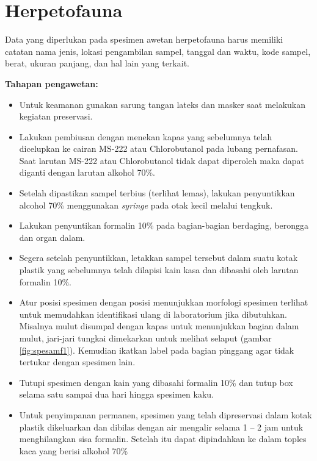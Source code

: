 \documentclass[
  oneside]{book}
\providecommand{\tightlist}{%
  \setlength{\itemsep}{0pt}\setlength{\parskip}{0pt}}
\begin{document}
\hypertarget{herpetofauna-1}{%
\section*{Herpetofauna}\label{herpetofauna-1}}

Data yang diperlukan pada spesimen awetan herpetofauna harus memiliki catatan nama jenis, lokasi pengambilan sampel, tanggal dan waktu, kode sampel, berat, ukuran panjang, dan hal lain yang terkait.

\textbf{Tahapan pengawetan:}

\begin{itemize}
\tightlist
\item
  Untuk keamanan gunakan sarung tangan lateks dan masker saat melakukan kegiatan preservasi.
\item
  Lakukan pembiusan dengan menekan kapas yang sebelumnya telah dicelupkan ke cairan MS-222 atau Chlorobutanol pada lubang pernafasan. Saat larutan MS-222 atau Chlorobutanol tidak dapat diperoleh maka dapat diganti dengan larutan alkohol 70\%.
\item
  Setelah dipastikan sampel terbius (terlihat lemas), lakukan penyuntikkan alcohol 70\% menggunakan \emph{syringe} pada otak kecil melalui tengkuk.
\item
  Lakukan penyuntikan formalin 10\% pada bagian-bagian berdaging, berongga dan organ dalam.
\item
  Segera setelah penyuntikkan, letakkan sampel tersebut dalam suatu kotak plastik yang sebelumnya telah dilapisi kain kasa dan dibasahi oleh larutan formalin 10\%.
\item
  Atur posisi spesimen dengan posisi menunjukkan morfologi spesimen terlihat untuk memudahkan identifikasi ulang di laboratorium jika dibutuhkan. Misalnya mulut disumpal dengan kapas untuk menunjukkan bagian dalam mulut, jari-jari tungkai dimekarkan untuk melihat selaput (gambar \ref{fig:spesamf1}). Kemudian ikatkan label pada bagian pinggang agar tidak tertukar dengan spesimen lain.
\item
  Tutupi spesimen dengan kain yang dibasahi formalin 10\% dan tutup box selama satu sampai dua hari hingga spesimen kaku.
\item
  Untuk penyimpanan permanen, spesimen yang telah dipreservasi dalam kotak plastik dikeluarkan dan dibilas dengan air mengalir selama 1 -- 2 jam untuk menghilangkan sisa formalin. Setelah itu dapat dipindahkan ke dalam toples kaca yang berisi alkohol 70\%
\end{itemize}
\end{document}
